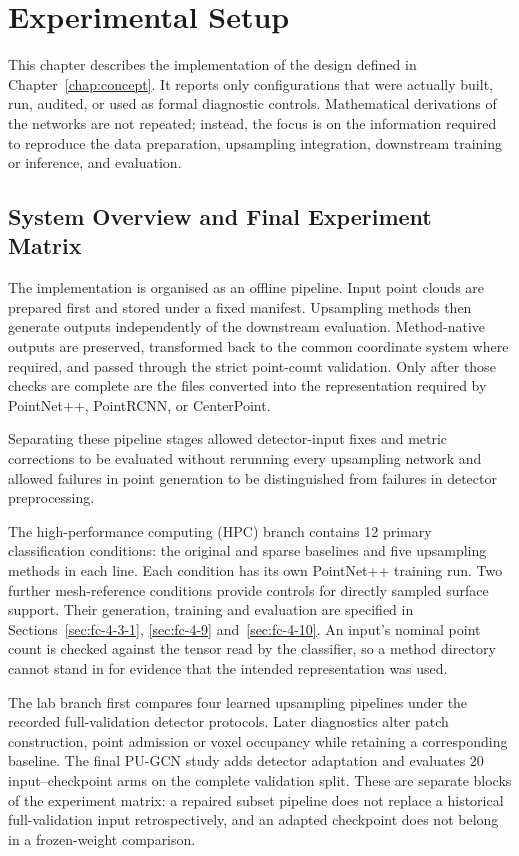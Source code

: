 \chapter{Experimental Setup}
\label{chap:setup}

This chapter describes the implementation of the design defined in Chapter~\ref{chap:concept}. It reports only configurations that were actually built, run, audited, or used as formal diagnostic controls. Mathematical derivations of the networks are not repeated; instead, the focus is on the information required to reproduce the data preparation, upsampling integration, downstream training or inference, and evaluation.

\section{System Overview and Final Experiment Matrix}
\label{sec:fc-4-1}

The implementation is organised as an offline pipeline. Input point clouds are prepared first and stored under a fixed manifest. Upsampling methods then generate outputs independently of the downstream evaluation. Method-native outputs are preserved, transformed back to the common coordinate system where required, and passed through the strict point-count validation. Only after those checks are complete are the files converted into the representation required by PointNet++, PointRCNN, or CenterPoint.

Separating these pipeline stages allowed detector-input fixes and metric corrections to be evaluated without rerunning every upsampling network and allowed failures in point generation to be distinguished from failures in detector preprocessing.

The high-performance computing (HPC) branch contains 12 primary classification conditions: the
original and sparse baselines and five upsampling methods in each
line. Each condition has its own PointNet++ training run. Two further
mesh-reference conditions provide controls for directly sampled
surface support. Their generation, training and evaluation are
specified in Sections~\ref{sec:fc-4-3-1}, \ref{sec:fc-4-9}
and~\ref{sec:fc-4-10}. An input's nominal point count is checked against
the tensor read by the classifier, so a method directory cannot stand
in for evidence that the intended representation was used.

The lab branch first compares four learned upsampling pipelines under
the recorded full-validation detector protocols. Later diagnostics
alter patch construction, point admission or voxel occupancy while
retaining a corresponding baseline. The final PU-GCN study adds
detector adaptation and evaluates 20 input--checkpoint arms on the
complete validation split. These are separate blocks of the experiment
matrix: a repaired subset pipeline does not replace a historical
full-validation input retrospectively, and an adapted checkpoint does
not belong in a frozen-weight comparison.

